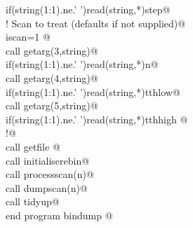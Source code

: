 \documentclass[10pt,a4paper,notitlepage]{article}
\begin{document}
\begin{flushleft}
\begin{minipage}{\linewidth}
\begin{list}{}{}
\mbox{}\verb@      if(string(1:1).ne.' ')read(string,*)step@\\
\mbox{}\verb@! Scan to treat (defaults if not supplied)@\\
\mbox{}\verb@      iscan=1 @\\
\mbox{}\verb@      call getarg(3,string)@\\
\mbox{}\verb@      if(string(1:1).ne.' ')read(string,*)n@\\
\mbox{}\verb@      call getarg(4,string)@\\
\mbox{}\verb@      if(string(1:1).ne.' ')read(string,*)tthlow@\\
\mbox{}\verb@      call getarg(5,string)@\\
\mbox{}\verb@      if(string(1:1).ne.' ')read(string,*)tthhigh     @\\
\mbox{}\verb@!@\\
\mbox{}\verb@      call getfile          @\\
\mbox{}\verb@      call initialiserebin@\\
\mbox{}\verb@      call processscan(n)@\\
\mbox{}\verb@      call dumpscan(n)@\\
\mbox{}\verb@      call tidyup@\\
\mbox{}\verb@      end program bindump                                                    @{\NWsep}
\end{list}
\vspace{-1.5ex}
\footnotesize
\begin{list}{}{\setlength{\itemsep}{-\parsep}\setlength{\itemindent}{-\leftmargin}}

\item{}
\end{list}
\end{minipage}\vspace{4ex}
\end{flushleft}
\end{document}
